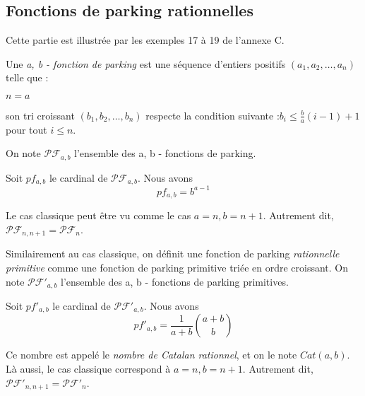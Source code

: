 \subsection{Fonctions de parking rationnelles}

Cette partie est illustrée par les exemples 17 à 19 de l'annexe C.

\begin{definition}
    Une \emph{a, b - fonction de parking} est une séquence d'entiers
    positifs $(a_1, a_2, \ldots, a_n)$ telle que :\\
    \begin{itemize*}
        \item $n = a$\\
        \item son tri croissant $(b_1, b_2, \ldots, b_n)$ respecte la
        condition suivante :$b_i \leqslant \frac{b}{a}(i-1) + 1$ 
        pour tout $i \leqslant n$.
    \end{itemize*}
\end{definition}

On note $\mathcal{PF}_{a,b}$ l'ensemble des a, b - fonctions de parking. 

\begin{theorem}
    Soit $pf_{a,b}$ le cardinal de $\mathcal{PF}_{a,b}$.
    Nous avons $$pf_{a,b} = b^{a-1}$$
\end{theorem}

\begin{rem}
Le cas classique peut être vu comme le cas $a = n, b = n + 1$.
Autrement dit, $\mathcal{PF}_{n, n + 1} = \mathcal{PF}_n$.
\end{rem}

Similairement au cas classique, on définit une fonction de parking
\emph{rationnelle primitive} comme une fonction de parking primitive
triée en ordre croissant.
On note $\mathcal{PF'}_{a,b}$ l'ensemble des a, b - fonctions de parking
primitives.

\begin{theorem}
    Soit $pf'_{a,b}$ le cardinal de $\mathcal{PF'}_{a,b}$.
    Nous avons $$\displaystyle pf'_{a,b} = 
    \frac{1}{a + b} \binom{a + b}{b}$$
\end{theorem}

Ce nombre est appelé le \emph{nombre de Catalan rationnel}, et on le note
$Cat(a,b)$.
Là aussi, le cas classique correspond à $a = n, b = n + 1$.
Autrement dit, $\mathcal{PF'}_{n, n + 1} = \mathcal{PF'}_n$.

